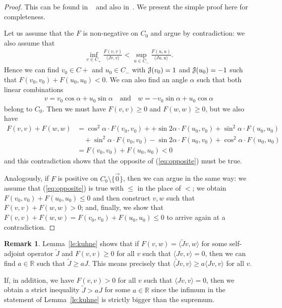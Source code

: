 \documentclass[12pt,reqno]{amsart}
\numberwithin{equation}{section}
\newcommand{\qand}{\quad\text{and}\quad}
\theoremstyle{plain}
\theoremstyle{definition}
\newtheorem{remark}[theorem]{Remark}
\newcommand{\RR}{{\mathbb R}}
\newcommand{\J}{\EuScript{J}}
\begin{document}
\begin{proof}
This can be found in ~\cite{Wojtk01} and also
in~\cite{Pota79}. We present the simple proof here for
completeness.

Let us assume that the $F$ is non-negative on $C_0$ and
argue by contradiction: we also assume that
\begin{align}\label{eq:opposite}
  \inf_{v\in C_+} \frac{F(v,v)}{\langle Jv,v\rangle}
  < \sup_{u\in C_-}\frac{F(u,u)}{\langle Ju,u\rangle}.
\end{align}
Hence we can find $v_0\in C+$ and $u_0\in C_-$ with $\J(v_0)=1$
and $\J(u_0)=-1$ such that $F(v_0,v_0)+F(u_0,u_0)<0$. We can also
find an angle $\alpha$ such that both linear combinations
\begin{align*}
  v=v_0\cos\alpha+u_0\sin\alpha \qand
  w=-v_0\sin\alpha+u_0\cos\alpha
\end{align*}
belong to $C_0$. Then we must have $F(v,v)\ge0$ and
$F(w,w)\ge0$, but we also have
\begin{align*}
  F(v,v)+F(w,w)
  &=
  \cos^2\alpha\cdot F(v_0,v_0)+
  +\sin2\alpha\cdot F(u_0,v_0) + \sin^2\alpha \cdot
  F(u_0,u_0)
  \\
  &\quad+
  \sin^2\alpha\cdot F(v_0,v_0)-\sin2\alpha\cdot F(u_0,v_0)+
  \cos^2\alpha\cdot F(u_0,u_0)
  \\
  &=
  F(v_0,v_0)+F(u_0,u_0)<0
\end{align*}
and this contradiction shows that the opposite of
(\ref{eq:opposite}) must be true.

Analogously, if $F$ is positive on $C_0\setminus\{\vec0\}$,
then we can argue in the same way: we assume that
(\ref{eq:opposite}) is true with $\le$ in the place of $<$;
we obtain $F(v_0,v_0)+F(u_0,u_0)\le0$ and then construct
$v,w$ such that $F(v,v)+F(w,w)>0$; and, finally, we show
that $F(v,v)+F(w,w)= F(v_0,v_0)+F(u_0,u_0)\le0$ to arrive
again at a contradiction.
\end{proof}



\begin{remark}
  \label{rmk:Jseparated}
  Lemma~\ref{le:kuhne} shows that if $F(v,w)=\langle \tilde J
  v,w\rangle$ for some self-adjoint operator $\tilde J$ and
  $F(v,v)\ge0$ for all $v$ such that $\langle J v,
  v\rangle=0$, then we can find $a\in\RR$ such that
  $\tilde J \ge a J$. This means precisely that $\langle
  \tilde J v,v\rangle\ge a\langle Jv, v\rangle$ for all
  $v$.

  If, in addition, we have $F(v,v)>0$ for all $v$ such that
  $\langle J v, v\rangle=0$, then we obtain a strict
  inequality $\tilde J > a J$ for some $a\in\RR$ since the
  infimum in the statement of Lemma~\ref{le:kuhne} is
  strictly bigger than the supremum.
\end{remark}
\end{document}
